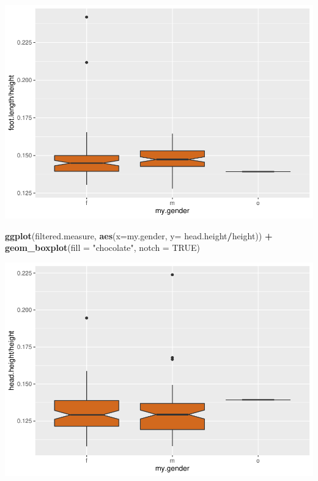 \documentclass[]{article}
\newenvironment{Shaded}{\begin{snugshade}}{\end{snugshade}}
\newcommand{\DataTypeTok}[1]{\textcolor[rgb]{0.13,0.29,0.53}{#1}}
\newcommand{\KeywordTok}[1]{\textcolor[rgb]{0.13,0.29,0.53}{\textbf{#1}}}
\newcommand{\NormalTok}[1]{#1}
\newcommand{\OperatorTok}[1]{\textcolor[rgb]{0.81,0.36,0.00}{\textbf{#1}}}
\newcommand{\OtherTok}[1]{\textcolor[rgb]{0.56,0.35,0.01}{#1}}
\newcommand{\StringTok}[1]{\textcolor[rgb]{0.31,0.60,0.02}{#1}}
\begin{document}
\includegraphics{project-measure_files/figure-latex/proportions-3.pdf}

\begin{Shaded}
\begin{Highlighting}[]
\KeywordTok{ggplot}\NormalTok{(filtered.measure, }\KeywordTok{aes}\NormalTok{(}\DataTypeTok{x=}\NormalTok{my.gender, }\DataTypeTok{y=}\NormalTok{ head.height}\OperatorTok{/}\NormalTok{height)) }\OperatorTok{+}
\StringTok{  }\KeywordTok{geom\_boxplot}\NormalTok{(}\DataTypeTok{fill =} \StringTok{"chocolate"}\NormalTok{, }\DataTypeTok{notch =} \OtherTok{TRUE}\NormalTok{)}
\end{Highlighting}
\end{Shaded}

\includegraphics{project-measure_files/figure-latex/proportions-4.pdf}






\newpage
\theendnotes

\newpage
\begin{auxmulticols}{2}
\singlespacing 


\end{auxmulticols}

\newpage
{
\hypersetup{linkcolor=black}
\setcounter{tocdepth}{3}
\tableofcontents
}
\end{document}

